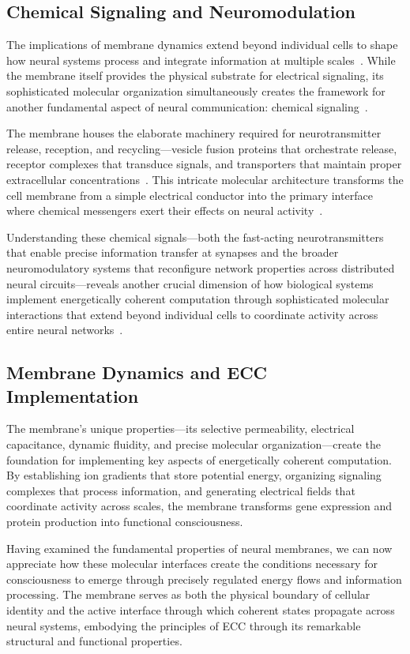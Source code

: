\subsection*{Chemical Signaling and Neuromodulation~}

The implications of membrane dynamics extend beyond individual cells to shape how neural systems process and integrate information at multiple scales~\cite{Zimmerberg2006, Kusumi2012}. While the membrane itself provides the physical substrate for electrical signaling, its sophisticated molecular organization simultaneously creates the framework for another fundamental aspect of neural communication: chemical signaling~\cite{Sudhof2013, Choquet2013}.

The membrane houses the elaborate machinery required for neurotransmitter release, reception, and recycling—vesicle fusion proteins that orchestrate release, receptor complexes that transduce signals, and transporters that maintain proper extracellular concentrations~\cite{Garcia-Parajo2014, Goni2014}. This intricate molecular architecture transforms the cell membrane from a simple electrical conductor into the primary interface where chemical messengers exert their effects on neural activity~\cite{Andersen1992, Sachs2010}.

Understanding these chemical signals—both the fast-acting neurotransmitters that enable precise information transfer at synapses and the broader neuromodulatory systems that reconfigure network properties across distributed neural circuits—reveals another crucial dimension of how biological systems implement energetically coherent computation through sophisticated molecular interactions that extend beyond individual cells to coordinate activity across entire neural networks~\cite{Marder2012, Dayan2012}.

\subsection*{Membrane Dynamics and ECC Implementation~}

The membrane's unique properties—its selective permeability, electrical capacitance, dynamic fluidity, and precise molecular organization—create the foundation for implementing key aspects of energetically coherent computation. By establishing ion gradients that store potential energy, organizing signaling complexes that process information, and generating electrical fields that coordinate activity across scales, the membrane transforms gene expression and protein production into functional consciousness.

Having examined the fundamental properties of neural membranes, we can now appreciate how these molecular interfaces create the conditions necessary for consciousness to emerge through precisely regulated energy flows and information processing. The membrane serves as both the physical boundary of cellular identity and the active interface through which coherent states propagate across neural systems, embodying the principles of ECC through its remarkable structural and functional properties.
